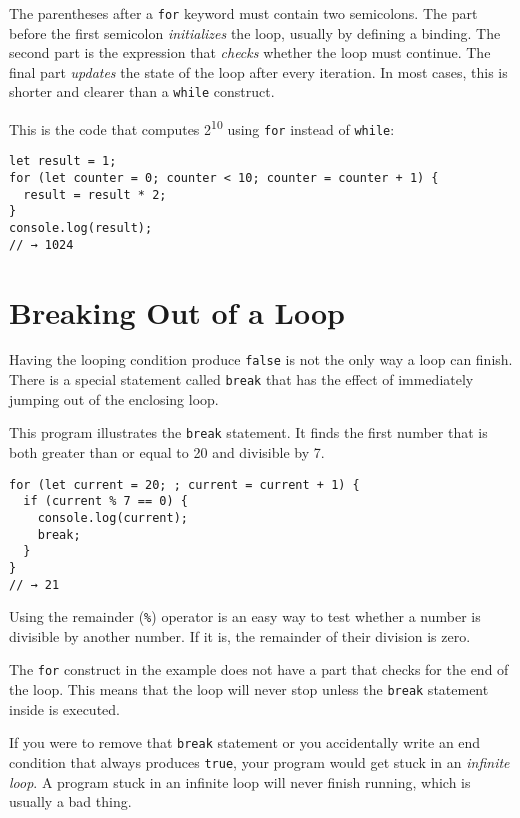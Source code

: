 The parentheses after a \lstinline`for` keyword must contain two semicolons. The part before the first semicolon \emph{initializes} the loop, usually by defining a binding. The second part is the expression that \emph{checks} whether the loop must continue. The final part \emph{updates} the state of the loop after every iteration. In most cases, this is shorter and clearer than a \lstinline`while` construct.

This is the code that computes 2\textsuperscript{10} using \lstinline`for` instead of \lstinline`while`:

\begin{lstlisting}
let result = 1;
for (let counter = 0; counter < 10; counter = counter + 1) {
  result = result * 2;
}
console.log(result);
// → 1024
\end{lstlisting}
\noindent

\section{Breaking Out of a Loop}

Having the looping condition produce \lstinline`false` is not the only way a loop can finish. There is a special statement called \lstinline`break` that has the effect of immediately jumping out of the enclosing loop.

This program illustrates the \lstinline`break` statement. It finds the first number that is both greater than or equal to 20 and divisible by 7.

\begin{lstlisting}
for (let current = 20; ; current = current + 1) {
  if (current % 7 == 0) {
    console.log(current);
    break;
  }
}
// → 21
\end{lstlisting}
\noindent{}

Using the remainder (\lstinline`%`) operator is an easy way to test whether a number is divisible by another number. If it is, the remainder of their division is zero.

The \lstinline`for` construct in the example does not have a part that checks for the end of the loop. This means that the loop will never stop unless the \lstinline`break` statement inside is executed.

If you were to remove that \lstinline`break` statement or you accidentally write an end condition that always produces \lstinline`true`, your program would get stuck in an \emph{infinite loop}. A program stuck in an infinite loop will never finish running, which is usually a bad thing.

